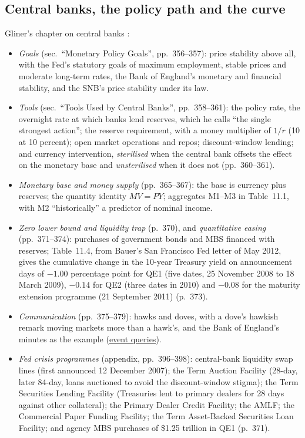 \subsection{Central banks, the policy path and the curve}

\begin{qfdefinition}\label{def:central-bank-policy-framework}
 Gliner's chapter on central banks \citep[chap.~11, PDF pp.~355--400]{s7-gliner}:
\begin{itemize}
\item \emph{Goals} (sec.\ ``Monetary Policy Goals'', pp.~356--357): price stability above all, with the Fed's statutory goals of maximum employment, stable prices and moderate long-term rates, the Bank of England's monetary and financial stability, and the SNB's price stability under its law.
\item \emph{Tools} (sec.\ ``Tools Used by Central Banks'', pp.~358--361): the policy rate, the overnight rate at which banks lend reserves, which he calls ``the single strongest action''; the reserve requirement, with a money multiplier of $1/r$ (10 at 10 percent); open market operations and repos; discount-window lending; and currency intervention, \emph{sterilised} when the central bank offsets the effect on the monetary base and \emph{unsterilised} when it does not (pp.~360--361).
\item \emph{Monetary base and money supply} (pp.~365--367): the base is currency plus reserves; the quantity identity $MV=PY$; aggregates M1--M3 in Table~11.1, with M2 ``historically'' a predictor of nominal income.
\item \emph{Zero lower bound and liquidity trap} (p.~370), and \emph{quantitative easing} (pp.~371--374): purchases of government bonds and MBS financed with reserves; Table~11.4, from Bauer's San Francisco Fed letter of May 2012, gives the cumulative change in the 10-year Treasury yield on announcement days of $-1.00$ percentage point for QE1 (five dates, 25 November 2008 to 18 March 2009), $-0.14$ for QE2 (three dates in 2010) and $-0.08$ for the maturity extension programme (21 September 2011) (p.~373).
\item \emph{Communication} (pp.~375--379): hawks and doves, with a dove's hawkish remark moving markets more than a hawk's, and the Bank of England's minutes as the example (\hyperref[meth:macro-event-queries]{event queries}).
\item \emph{Fed crisis programmes} (appendix, pp.~396--398): central-bank liquidity swap lines (first announced 12 December 2007); the Term Auction Facility (28-day, later 84-day, loans auctioned to avoid the discount-window stigma); the Term Securities Lending Facility (Treasuries lent to primary dealers for 28 days against other collateral); the Primary Dealer Credit Facility; the AMLF; the Commercial Paper Funding Facility; the Term Asset-Backed Securities Loan Facility; and agency MBS purchases of \$1.25 trillion in QE1 (p.~371).
\end{itemize}


\end{qfdefinition}
